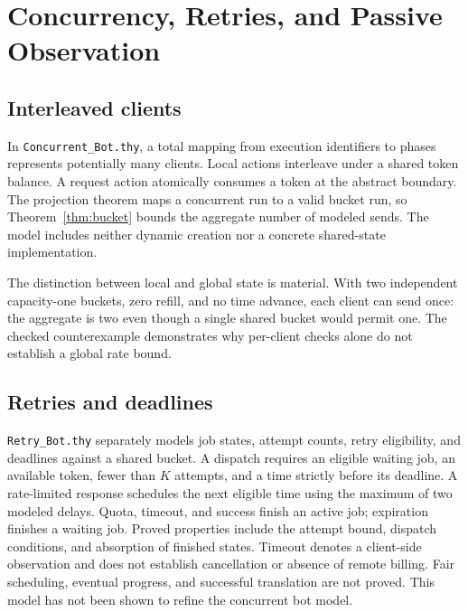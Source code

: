 \documentclass[10pt,twocolumn]{article}
\begin{document}
\section{Concurrency, Retries, and Passive Observation}
\subsection{Interleaved clients}
In \texttt{Concurrent\_Bot.thy}, a total mapping from execution identifiers to phases represents potentially many clients. Local actions interleave under a shared token balance. A request action atomically consumes a token at the abstract boundary. The projection theorem maps a concurrent run to a valid bucket run, so Theorem~\ref{thm:bucket} bounds the aggregate number of modeled sends. The model includes neither dynamic creation nor a concrete shared-state implementation.

The distinction between local and global state is material. With two independent capacity-one buckets, zero refill, and no time advance, each client can send once: the aggregate is two even though a single shared bucket would permit one. The checked counterexample demonstrates why per-client checks alone do not establish a global rate bound.

\subsection{Retries and deadlines}
\texttt{Retry\_Bot.thy} separately models job states, attempt counts, retry eligibility, and deadlines against a shared bucket. A dispatch requires an eligible waiting job, an available token, fewer than $K$ attempts, and a time strictly before its deadline. A rate-limited response schedules the next eligible time using the maximum of two modeled delays. Quota, timeout, and success finish an active job; expiration finishes a waiting job. Proved properties include the attempt bound, dispatch conditions, and absorption of finished states. Timeout denotes a client-side observation and does not establish cancellation or absence of remote billing. Fair scheduling, eventual progress, and successful translation are not proved. This model has not been shown to refine the concurrent bot model.
\end{document}
